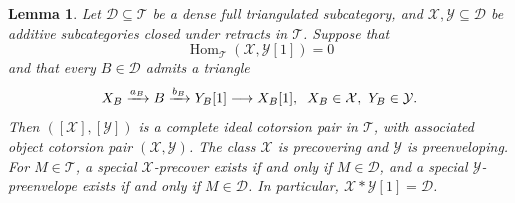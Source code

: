 \documentclass[11pt,a4paper,reqno]{amsart}
\newcommand{\Dcal}{\mathcal D}
\newcommand{\Tcal}{\mathcal T}
\newcommand{\Xcal}{\mathcal X}
\newcommand{\Hom}{\operatorname{Hom}}
\theoremstyle{plain}
\newtheorem{lemma}[theorem]{Lemma}
\theoremstyle{definition}
\theoremstyle{remark}
\newcommand{\Ycal}{\mathcal Y}
\begin{document}
\begin{lemma}\label{lem:dense}
Let $\Dcal\subseteq\Tcal$ be a dense full triangulated subcategory, and $\Xcal,\Ycal\subseteq\Dcal$ be additive subcategories closed under retracts in $\Tcal$. Suppose that
$$
\Hom_{\Tcal}(\Xcal,\Ycal[1])=0
$$
and that every $B\in\Dcal$ admits a triangle
\begin{equation}\label{eq:decomposition}
X_B\xrightarrow{a_B}B\xrightarrow{b_B}Y_B[1]\longrightarrow X_B[1],
\hspace{2mm}X_B\in\Xcal,\ Y_B\in\Ycal.
\end{equation}
Then $([\Xcal],[\Ycal])$ is a complete ideal cotorsion pair in $\Tcal$, with associated object cotorsion pair $(\Xcal,\Ycal)$. The class $\Xcal$ is precovering and $\Ycal$ is preenveloping. For $M\in\Tcal$, a special $\Xcal$-precover exists if and only if $M\in\Dcal$, and a special $\Ycal$-preenvelope exists if and only if $M\in\Dcal$. In particular, $\Xcal*\Ycal[1]=\Dcal$.
\end{lemma}
\end{document}
